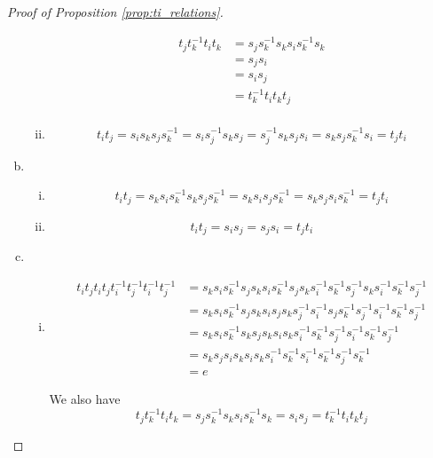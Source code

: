 \documentclass[11pt]{amsart}
\theoremstyle{definition}
\begin{document}
\begin{proof}[Proof of Proposition \ref{prop:ti_relations}]
\begin{enumerate}[a)]
\begin{enumerate}[i)]
\begin{align*}
t_jt_k^{-1}t_it_k &= s_js_k^{-1}s_ks_is_k^{-1}s_k\\
&= s_js_i\\
&= s_is_j\\
&= t_k^{-1}t_it_kt_j\\
\end{align*}

\item $$t_it_j = s_is_ks_js_k^{-1} = s_is_j^{-1}s_ks_j = s_j^{-1}s_ks_js_i = s_ks_js_k^{-1}s_i = t_jt_i$$
\end{enumerate}
\item
\begin{enumerate}[i)]
\item $$t_it_j = s_ks_is_k^{-1}s_ks_js_k^{-1} = s_ks_is_js_k^{-1} = s_ks_js_is_k^{-1} = t_jt_i$$
\item $$t_it_j = s_is_j = s_js_i = t_jt_i$$
\end{enumerate}
\item
\begin{enumerate}[i)]
\item
\begin{align*}
t_it_jt_it_jt_i^{-1}t_j^{-1}t_i^{-1}t_j^{-1} &= s_ks_is_k^{-1}s_js_ks_is_k^{-1}s_js_ks_i^{-1}s_k^{-1}s_j^{-1}s_ks_i^{-1}s_k^{-1}s_j^{-1}\\
&=s_ks_is_k^{-1}s_js_ks_is_js_ks_j^{-1}s_i^{-1}s_js_k^{-1}s_j^{-1}s_i^{-1}s_k^{-1}s_j^{-1}\\
&=s_ks_is_k^{-1}s_ks_js_ks_is_ks_i^{-1}s_k^{-1}s_j^{-1}s_i^{-1}s_k^{-1}s_j^{-1}\\
&=s_ks_js_is_ks_is_ks_i^{-1}s_k^{-1}s_i^{-1}s_k^{-1}s_j^{-1}s_k^{-1}\\
&= e
\end{align*}

We also have
$$t_jt_k^{-1}t_it_k = s_js_k^{-1}s_ks_is_k^{-1}s_k = s_is_j = t_k^{-1}t_it_kt_j$$ 


\end{enumerate}
\end{enumerate}
\end{proof}
\end{document}
